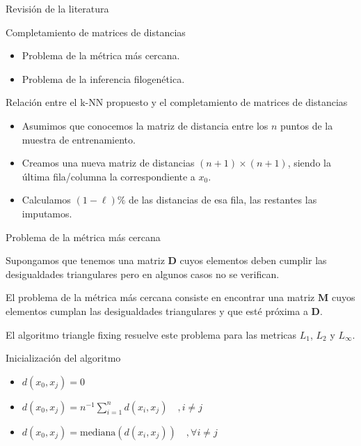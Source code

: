 \documentclass[10pt]{beamer}
\begin{document}
\begin{frame}{Revisión de la literatura}

\begin{block}{Completamiento de matrices de distancias}
\begin{itemize}
    \item Problema de la métrica más cercana.
    \item Problema de la inferencia filogenética.
\end{itemize}
\end{block}

\begin{block}{Relación entre el k-NN propuesto y el completamiento de matrices de distancias}
\begin{itemize}
    \item Asumimos que conocemos la matriz de distancia entre los $n$ puntos de la muestra de entrenamiento.
    \item Creamos una nueva matriz de distancias $(n+1) \times (n+1)$, siendo la última fila/columna la correspondiente a $x_0$.
    \item Calculamos $(1-\ell)\%$ de las distancias de esa fila, las restantes las imputamos.
\end{itemize}
\end{block}

\end{frame}

\begin{frame}{Problema de la métrica más cercana}

\begin{block}{}
Supongamos que tenemos una matriz $\pmb{D}$ cuyos elementos deben cumplir las desigualdades triangulares pero en algunos casos no se verifican. \vspace{0.25cm}

El \alert{problema de la métrica más cercana} consiste en encontrar una matriz $\pmb{M}$ cuyos elementos cumplan las desigualdades triangulares y que esté próxima a $\pmb{D}$. \vspace{0.25cm}

El \alert{algoritmo triangle fixing} resuelve este problema para las metricas $L_1$, $L_2$ y $L_\infty$.
\end{block}

\begin{block}{Inicialización del algoritmo}
\begin{itemize}
	\item $d(x_0,x_j) = 0$
	\item $d(x_0,x_j) = n^{-1} \sum\limits_{i=1}^{n}d(x_i,x_j)  \quad , i \neq j$
	\item $d(x_0,x_j) = \text{mediana}(d(x_i,x_j)) \quad , \forall i \neq j$
\end{itemize}
\end{block}
\end{frame}
\end{document}
